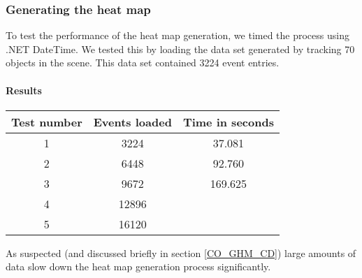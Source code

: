 \subsubsection{Generating the heat map}
\label{Test_P_Generating}
To test the performance of the heat map generation, we timed the process using .NET DateTime. We tested this by loading the data set generated by tracking 70 objects in the scene. This data set contained 3224 event entries.

\paragraph{Results}
\begin{center}
\begin{tabular}{| c | c | c |}
\hline
Test number & Events loaded & Time in seconds \\ 
\hline
1 & 3224 & 37.081 \\ 
\hline
2 & 6448 & 92.760 \\ 
\hline
3 & 9672 & 169.625 \\
\hline
4 & 12896 &  \\
\hline
5 & 16120 &  \\
\hline
\end{tabular}
\end{center}
As suspected (and discussed briefly in section \ref{CO_GHM_CD}) large amounts of data slow down the heat map generation process significantly. 
